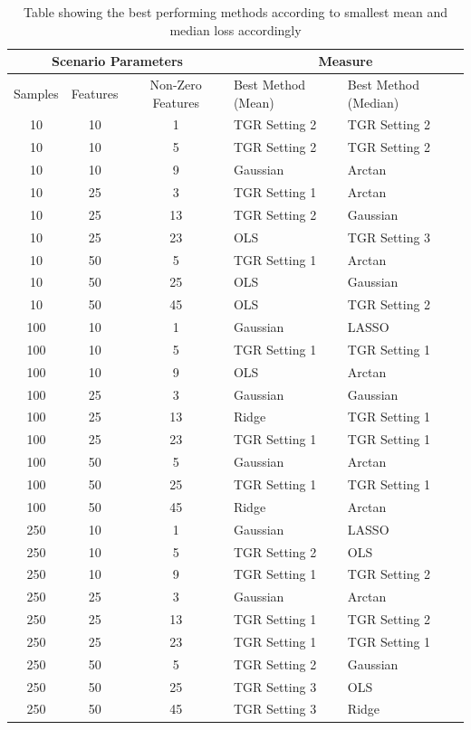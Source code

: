 \documentclass[12pt,a4paper]{article}
\begin{document}
\begin{table}[h!]
\begin{tabular}{ccc|l|l}
\toprule
\multicolumn{3}{c}{Scenario Parameters} & \multicolumn{2}{c}{Measure}\\
\midrule
Samples & Features & Non-Zero Features & Best Method (Mean) & Best Method (Median) \\
\midrule
10 & 10 & 1 & TGR Setting 2 & TGR Setting 2 \\
10 & 10 & 5 & TGR Setting 2 & TGR Setting 2 \\
10 & 10 & 9 & Gaussian & Arctan \\
10 & 25 & 3 & TGR Setting 1 & Arctan \\
10 & 25 & 13 & TGR Setting 2 & Gaussian \\
10 & 25 & 23 & OLS & TGR Setting 3 \\
10 & 50 & 5 & TGR Setting 1 & Arctan \\
10 & 50 & 25 & OLS & Gaussian \\
10 & 50 & 45 & OLS & TGR Setting 2 \\
100 & 10 & 1 & Gaussian & LASSO \\
100 & 10 & 5 & TGR Setting 1 & TGR Setting 1 \\
100 & 10 & 9 & OLS & Arctan \\
100 & 25 & 3 & Gaussian & Gaussian \\
100 & 25 & 13 & Ridge & TGR Setting 1 \\
100 & 25 & 23 & TGR Setting 1 & TGR Setting 1 \\
100 & 50 & 5 & Gaussian & Arctan \\
100 & 50 & 25 & TGR Setting 1 & TGR Setting 1 \\
100 & 50 & 45 & Ridge & Arctan \\
250 & 10 & 1 & Gaussian & LASSO \\
250 & 10 & 5 & TGR Setting 2 & OLS \\
250 & 10 & 9 & TGR Setting 1 & TGR Setting 2 \\
250 & 25 & 3 & Gaussian & Arctan \\
250 & 25 & 13 & TGR Setting 1 & TGR Setting 2 \\
250 & 25 & 23 & TGR Setting 1 & TGR Setting 1 \\
250 & 50 & 5 & TGR Setting 2 & Gaussian \\
250 & 50 & 25 & TGR Setting 3 & OLS \\
250 & 50 & 45 & TGR Setting 3 & Ridge \\
\bottomrule
\end{tabular}
\caption{Table showing the best performing methods according to smallest mean and median loss accordingly}
\label{tab:bestmethod}
\end{table}
\end{document}

